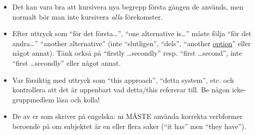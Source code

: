 \documentclass[a4paper,12pt]{article}
\begin{document}
\begin{itemize}
\item    Det kan vara bra att kursivera nya begrepp första gången de används, men normalt bör man inte kursivera \emph{alla} förekomster.

\item    Efter uttryck som ``för det första\ldots'', ``one alternative is\ldots'' måste följa ``för det andra\ldots'' ``another alternative'' (inte ``slutligen'', ``dels'', ``another \underline{option}'' eller något annat).  Tänk också på ``firstly \ldots secondly'' resp. ``first \ldots second'', inte ``first \ldots secondly'' eller något annat.

\item    Var försiktig med uttryck som ``this approach'', ``detta system'', etc. och kontrollera att det är uppenbart vad detta/this refererar till. Be någon icke-gruppmedlem läsa och kolla!

\item    De av er som skriver på engelska: ni MÅSTE använda korrekta verbformer beroende på om subjektet är en eller flera saker (``it has'' men ``they have'').
\end{itemize}
\fi
\end{document}
